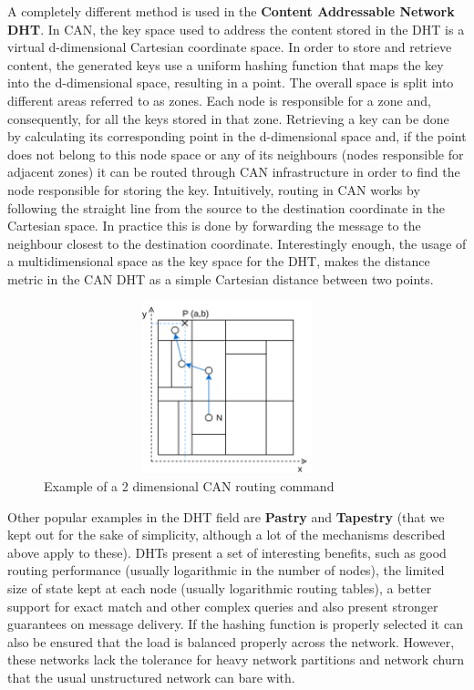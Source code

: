 A completely different method is used in the \textbf{Content Addressable
Network DHT}\cite{Ratnasamy2001a}. In CAN, the key space used to
address the content stored in the DHT is a virtual d-dimensional
Cartesian coordinate space. In order to store and retrieve content, the
generated keys use a uniform hashing function that maps the key into the
d-dimensional space, resulting in a point. The overall space is split
into different areas referred to as zones. Each node is responsible for
a zone and, consequently, for all the keys stored in that zone.
Retrieving a key can be done by calculating its corresponding point in
the d-dimensional space and, if the point does not belong to this node
space or any of its neighbours (nodes responsible for adjacent zones) it
can be routed through CAN infrastructure in order to find the node
responsible for storing the key. Intuitively, routing in CAN works by
following the straight line from the source to the destination
coordinate in the Cartesian space. In practice this is done by
forwarding the message to the neighbour closest to the destination
coordinate. Interestingly enough, the usage of a multidimensional space
as the key space for the DHT, makes the distance metric in the CAN DHT
as a simple Cartesian distance between two points.

\begin{figure}[hb!]
  \centering
  \includegraphics[max height=5cm,max width=0.95\textwidth]{img/can.png}
  \caption{Example of a 2 dimensional CAN routing command}
  \label{fig:can}
\end{figure}

Other popular examples in the DHT field are \textbf{Pastry} \cite{Rowstron2001} and
\textbf{Tapestry} \cite{Zhao2006} (that we kept out for the sake of simplicity, although
a lot of the mechanisms described above apply to these). DHTs present a
set of interesting benefits, such as good routing performance (usually
logarithmic in the number of nodes), the limited size of state kept at
each node (usually logarithmic routing tables), a better support for
exact match and other complex queries and also present stronger
guarantees on message delivery. If the hashing function is properly
selected it can also be ensured that the load is balanced properly
across the network. However, these networks lack the tolerance for heavy
network partitions and network churn that the usual unstructured network
can bare with.
\bigskip

